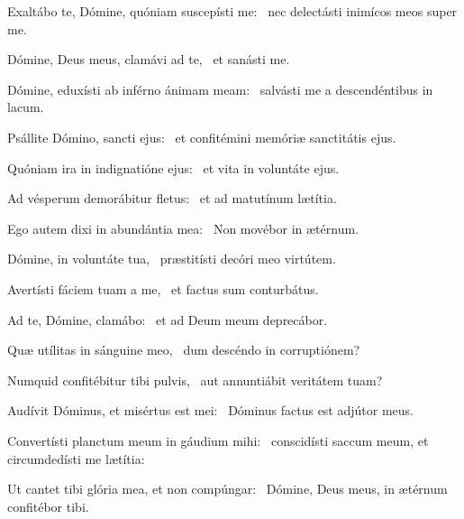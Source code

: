 \item Exaltábo te, Dómine, quóniam suscepísti me:~\psstar{} nec delectásti inimícos meos super me.

\item Dómine, Deus meus, clamávi ad te,~\psstar{} et sanásti me.

\item Dómine, eduxísti ab inférno ánimam meam:~\psstar{} salvásti me a descendéntibus in lacum.

\item Psállite Dómino, sancti ejus:~\psstar{} et confitémini memóriæ sanctitátis ejus.

\item Quóniam ira in indignatióne ejus:~\psstar{} et vita in voluntáte ejus.

\item Ad vésperum demorábitur fletus:~\psstar{} et ad matutínum lætítia.

\item Ego autem dixi in abundántia mea:~\psstar{} Non movébor in ætérnum.

\item Dómine, in voluntáte tua,~\psstar{} præstitísti decóri meo virtútem.

\item Avertísti fáciem tuam a me,~\psstar{} et factus sum conturbátus.

\item Ad te, Dómine, clamábo:~\psstar{} et ad Deum meum deprecábor.

\item Quæ utílitas in sánguine meo,~\psstar{} dum descéndo in corruptiónem?

\item Numquid confitébitur tibi pulvis,~\psstar{} aut annuntiábit veritátem tuam?

\item Audívit Dóminus, et misértus est mei:~\psstar{} Dóminus factus est adjútor meus.

\item Convertísti planctum meum in gáudium mihi:~\psstar{} conscidísti saccum meum, et circumdedísti me lætítia:

\item Ut cantet tibi glória mea, et non compúngar:~\psstar{} Dómine, Deus meus, in ætérnum confitébor tibi.


